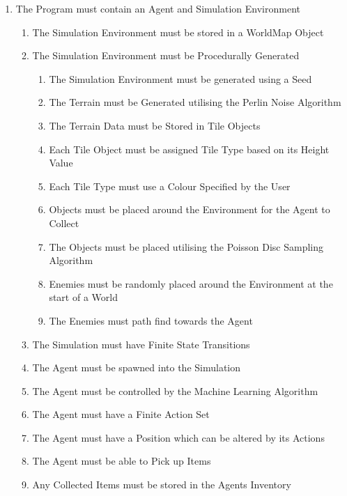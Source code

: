 \begin{flushleft}
\begin{enumerate}
                \item The Program must contain an Agent and Simulation Environment
                \begin{enumerate}
                    \item The Simulation Environment must be stored in a WorldMap Object 
                    \item The Simulation Environment must be Procedurally Generated
                    \begin{enumerate}
                        \item The Simulation Environment must be generated using a Seed
                        \item The Terrain must be Generated utilising the Perlin Noise Algorithm
                        \item The Terrain Data must be Stored in Tile Objects
                        \item Each Tile Object must be assigned Tile Type based on its Height Value
                        \item Each Tile Type must use a Colour Specified by the User
                        \item Objects must be placed around the Environment for the Agent to Collect
                        \item The Objects must be placed utilising the Poisson Disc Sampling Algorithm
                        \item Enemies must be randomly placed around the Environment at the start of a World
                        \item The Enemies must path find towards the Agent
                    \end{enumerate}
                    \item The Simulation must have Finite State Transitions
                    \item The Agent must be spawned into the Simulation
                    \item The Agent must be controlled by the Machine Learning Algorithm
                    \item The Agent must have a Finite Action Set
                    \item The Agent must have a Position which can be altered by its Actions
                    \item The Agent must be able to Pick up Items
                    \item Any Collected Items must be stored in the Agents Inventory

\end{enumerate}
\end{enumerate}
\end{flushleft}
